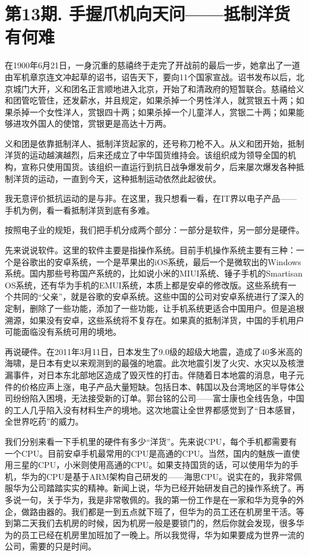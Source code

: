 \documentclass[
  letterpaper,
  DIV=11,
  numbers=noendperiod]{scrreprt}
\begin{document}

\chapter{第13期.
手握爪机向天问------抵制洋货有何难}\label{ux7b2c13ux671f.-ux624bux63e1ux722aux673aux5411ux5929ux95eeux62b5ux5236ux6d0bux8d27ux6709ux4f55ux96be}

在1900年6月21日，一身沉重的慈禧终于走完了开战前的最后一步，她拿出了一道由军机章京连文冲起草的诏书，诏告天下，要向11个国家宣战。诏书发布以后，北京城门大开，义和团名正言顺地进入北京，开始了和清政府的短暂联合。慈禧给义和团管吃管住，还发薪水，并且规定，如果杀掉一个男性洋人，就赏银五十两；如果杀掉一个女性洋人，赏银四十两；如果杀掉一个儿童洋人，赏银二十两；如果能够进攻外国人的使馆，赏银更是高达十万两。

义和团是依靠抵制洋人、抵制洋货起家的，还号称刀枪不入。从义和团开始，抵制洋货的运动越演越烈，后来还成立了中华国货维持会。该组织成为领导全国的机构，宣称只使用国货。该组织一直运行到抗日战争爆发前夕，后来屡次爆发各种抵制洋货的运动，一直到今天，这种抵制运动依然此起彼伏。

我无意评价抵抗运动的是与非。在这里，我只想看一看，在IT界以电子产品------手机为例，看一看抵制洋货到底有多难。

按照电子业的规矩，我们把手机分成两个部分：一部分是软件，另一部分是硬件。

先来说说软件。这里的软件主要是指操作系统。目前手机操作系统主要有三种：一个是谷歌出的安卓系统，一个是苹果出的iOS系统，最后一个是微软出的Windows系统。国内那些号称国产系统的，比如说小米的MIUI系统、锤子手机的Smartisan
OS系统，还有华为手机的EMUI系统，本质上都是安卓的修改版。这些系统有一个共同的``父亲''，就是谷歌的安卓系统。这些中国的公司对安卓系统进行了深入的定制，删除了一些功能，添加了一些功能，让手机系统更适合中国用户。但是追根溯源，如果没有安卓，这些系统将不复存在。如果真的抵制洋货，中国的手机用户可能面临没有系统可用的境地。

再说硬件。在2011年3月11日，日本发生了9.0级的超级大地震，造成了40多米高的海啸，是日本有史以来观测到的最强的地震。此次地震引发了火灾、水灾以及核泄漏事件，对日本东北部地区造成了毁灭性的打击。伴随着日本地震的消息，电子元件的价格应声上涨，电子产品大量短缺。包括日本、韩国以及台湾地区的半导体公司纷纷陷入困境，无法接受新的订单。郭台铭的公司------富士康也全线告急，中国的工人几乎陷入没有材料生产的境地。这次地震让全世界都感觉到了``日本感冒，全世界吃药''的威力。

我们分别来看一下手机里的硬件有多少``洋货''。先来说CPU，每个手机都需要有一个CPU。目前安卓手机最常用的CPU是高通的CPU。当然，国内的魅族一直使用三星的CPU，小米则使用高通的CPU。如果支持国货的话，可以使用华为的手机，华为的CPU是基于ARM架构自己研发的------海思CPU。说实在的，我非常佩服华为公司踏踏实实的精神。新闻上说，华为已经开始研发自己的操作系统了。再多说一句，关于华为，我是非常敬佩的。我的第一份工作是在一家和华为竞争的外企，做路由器的。我们都是一到五点就下班了，但华为的员工还在机房里干活。等到第二天我们去机房的时候，因为机房一般是要锁门的，然后你就会发现，很多华为的员工已经在机房里加班加了一晚上。所以我觉得，华为如果要成为世界一流的公司，需要的只是时间。
\end{document}
